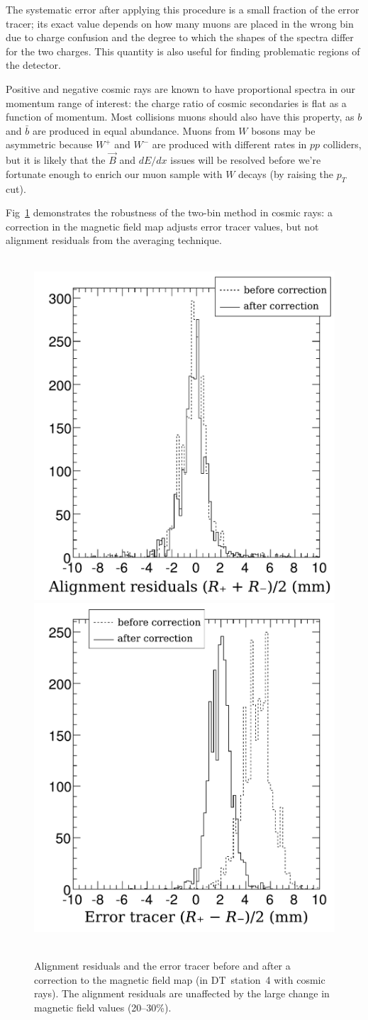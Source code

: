 \documentclass[12pt]{article}
\begin{document}
The systematic error after applying this procedure is a small fraction
of the error tracer; its exact value depends on how many muons are
placed in the wrong bin due to charge confusion and the degree to
which the shapes of the spectra differ for the two charges.  This
quantity is also useful for finding problematic regions of the
detector.

Positive and negative cosmic rays are known to have proportional
spectra in our momentum range of interest: the charge ratio of cosmic
secondaries is flat as a function of momentum.  Most collisions muons
should also have this property, as $b$ and $\bar{b}$ are produced in
equal abundance.  Muons from $W$ bosons may be asymmetric because
$W^+$ and $W^-$ are produced with different rates in $pp$ colliders,
but it is likely that the $\vec{B}$ and $dE/dx$ issues will be
resolved before we're fortunate enough to enrich our muon sample with
$W$ decays (by raising the $p_T$ cut).

Fig~\ref{fig:twobin_robust} demonstrates the robustness of the
two-bin method in cosmic rays: a correction in the magnetic field map
adjusts error tracer values, but not alignment residuals from the
averaging technique.

\begin{figure}
\mbox{ } \hfill \includegraphics[height=7 cm]{robustness_alignment1.pdf} \hfill
\includegraphics[height=7 cm]{robustness_errortracer2.pdf} \hfill \mbox{ }
\caption{Alignment residuals and the error tracer before and after a correction to the magnetic field map (in DT~station~4 with cosmic rays).  The alignment residuals are unaffected by the large change in magnetic field values (20--30\%). \label{fig:twobin_robust}}
\end{figure}
\end{document}
